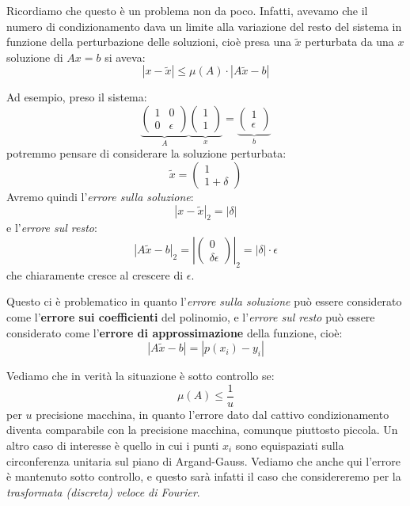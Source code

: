 \documentclass[a4paper,11pt]{article}
\begin{document}
Ricordiamo che questo è un problema non da poco.
Infatti, avevamo che il numero di condizionamento dava un limite alla variazione del resto del sistema in funzione della perturbazione delle soluzioni, cioè presa una $\tilde{x}$ perturbata da una $x$ soluzione di $Ax = b$ si aveva:
$$
|x - \tilde{x}| \leq \mu(A) \cdot |A \tilde{x} - b|
$$

Ad esempio, preso il sistema:
$$
\underbrace{
\begin{pmatrix}
	1 & 0 \\ 
	0 & \epsilon
\end{pmatrix}
}_A
\underbrace{
\begin{pmatrix}
	1 \\ 1
\end{pmatrix}
}_x
=
\underbrace{
\begin{pmatrix}
	1 \\ \epsilon
\end{pmatrix}
}_b
$$
potremmo pensare di considerare la soluzione perturbata:
$$
\tilde{x} =
\begin{pmatrix}
	1 \\ 1 + \delta
\end{pmatrix}
$$
Avremo quindi l'\textit{errore sulla soluzione}:
$$
|x - \tilde{x}|_2 = |\delta|
$$
e l'\textit{errore sul resto}:
$$
|A \tilde{x} - b|_2 = \left| \begin{pmatrix}
	0 \\ \delta \epsilon
\end{pmatrix} \right|_2
= |\delta| \cdot \epsilon
$$
che chiaramente cresce al crescere di $\epsilon$.

Questo ci è problematico in quanto l'\textit{errore sulla soluzione} può essere considerato come l'\textbf{errore sui coefficienti} del polinomio, e l'\textit{errore sul resto} può essere considerato come l'\textbf{errore di approssimazione} della funzione, cioè:
$$
|A \tilde{x} - b| = |p(x_i) - y_i|
$$

\par\smallskip

Vediamo che in verità la situazione è sotto controllo se:
$$
\mu(A) \leq \frac{1}{u}
$$
per $u$ precisione macchina, in quanto l'errore dato dal cattivo condizionamento diventa comparabile con la precisione macchina, comunque piuttosto piccola.
Un altro caso di interesse è quello in cui i punti $x_i$ sono equispaziati sulla circonferenza unitaria sul piano di Argand-Gauss.
Vediamo che anche qui l'errore è mantenuto sotto controllo, e questo sarà infatti il caso che considereremo per la \textit{trasformata (discreta) veloce di Fourier}.
\end{document}
